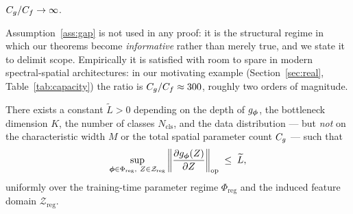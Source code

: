 \begin{assumption}
\label{ass:gap}
$C_g / C_f \to \infty$.
\end{assumption}

Assumption~\ref{ass:gap} is not used in any proof: it is the
structural regime in which our theorems become \emph{informative}
rather than merely true, and we state it to delimit scope.
Empirically it is satisfied with room to spare in modern
spectral-spatial architectures: in our motivating example
(Section~\ref{sec:real}, Table~\ref{tab:capacity}) the ratio is
$C_g/C_f \approx 300$, roughly two orders of magnitude.

\begin{assumption}
\label{ass:inputlip}
There exists a constant $\widetilde{L} > 0$ depending on the depth of
$g_{\boldsymbol{\phi}}$, the bottleneck dimension $K$, the number of classes
$N_{\mathrm{cls}}$, and the data distribution --- but \emph{not} on
the characteristic width $M$ or the total spatial parameter count
$C_g$ --- such that
\[
    \sup_{{\boldsymbol{\phi}} \in \Phi_{\mathrm{reg}},\ Z \in \mathcal{Z}_{\mathrm{reg}}}
    \left\| \frac{\partial g_{\boldsymbol{\phi}}(Z)}{\partial Z} \right\|_{\mathrm{op}}
    \;\leq\; \widetilde{L},
\]
uniformly over the training-time parameter regime
$\Phi_{\mathrm{reg}}$ and the induced feature domain
$\mathcal{Z}_{\mathrm{reg}}$.
\end{assumption}


